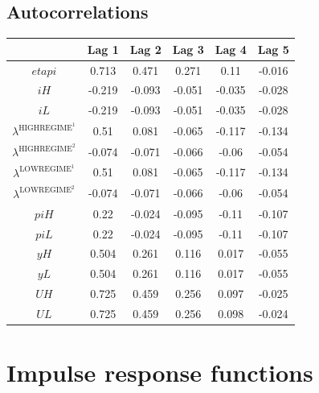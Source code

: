 \subsection{Autocorrelations}

\begin{tabular}{c|ccccc|}
  & Lag 1 & Lag 2 & Lag 3 & Lag 4 & Lag 5\\
\hline
${e\!t\!a\!p\!i}$ & 0.713 & 0.471 & 0.271 & 0.11 & -0.016 \\
${i\!H}$ & -0.219 & -0.093 & -0.051 & -0.035 & -0.028 \\
${i\!L}$ & -0.219 & -0.093 & -0.051 & -0.035 & -0.028 \\
$\lambda^{\mathrm{HIGHREGIME}^{\mathrm{1}}}$ & 0.51 & 0.081 & -0.065 & -0.117 & -0.134 \\
$\lambda^{\mathrm{HIGHREGIME}^{\mathrm{2}}}$ & -0.074 & -0.071 & -0.066 & -0.06 & -0.054 \\
$\lambda^{\mathrm{LOWREGIME}^{\mathrm{1}}}$ & 0.51 & 0.081 & -0.065 & -0.117 & -0.134 \\
$\lambda^{\mathrm{LOWREGIME}^{\mathrm{2}}}$ & -0.074 & -0.071 & -0.066 & -0.06 & -0.054 \\
${p\!i\!H}$ & 0.22 & -0.024 & -0.095 & -0.11 & -0.107 \\
${p\!i\!L}$ & 0.22 & -0.024 & -0.095 & -0.11 & -0.107 \\
${y\!H}$ & 0.504 & 0.261 & 0.116 & 0.017 & -0.055 \\
${y\!L}$ & 0.504 & 0.261 & 0.116 & 0.017 & -0.055 \\
${U\!H}$ & 0.725 & 0.459 & 0.256 & 0.097 & -0.025 \\
${U\!L}$ & 0.725 & 0.459 & 0.256 & 0.098 & -0.024 \\
\hline
\end{tabular}



\pagebreak

\section{Impulse response functions}

